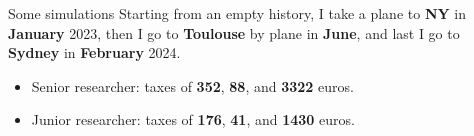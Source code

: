 \documentclass[french, english]{beamer}
\begin{document}
\begin{frame}{Some simulations}
    Starting from an empty history, I take a plane to \textbf{NY} in \textbf{January} 2023, then I go to \textbf{Toulouse} by plane in \textbf{June}, and  last I go to \textbf{Sydney} in \textbf{February} 2024. 
    \begin{itemize}
    \item Senior researcher: taxes of \textbf{352}, \textbf{88}, and \textbf{3322} euros.
    \item Junior researcher: taxes of \textbf{176}, \textbf{41}, and \textbf{1430} euros. 
    \end{itemize}
\end{frame}
\end{document}
